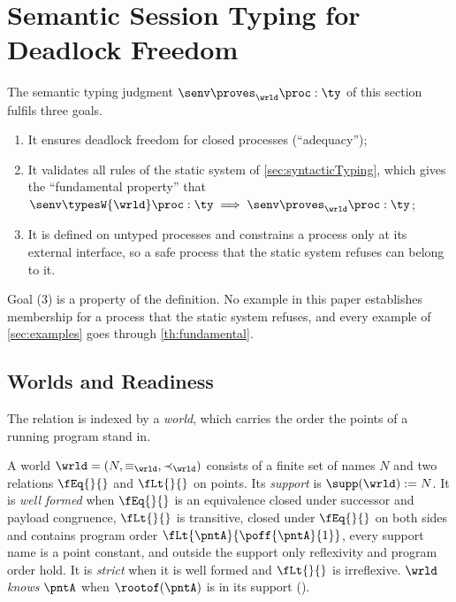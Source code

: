 \section{Semantic Session Typing for Deadlock Freedom}
\label{sec:logicalRelation}

The semantic typing judgment $\senv \proves_{\wrld} \proc : \ty$ of this
section fulfils three goals.
\begin{enumerate}[(1)]
  \item It ensures deadlock freedom for closed processes (``adequacy'');
  \item
    It validates all rules of the static system of
    \cref{sec:syntacticTyping}, which gives the ``fundamental property''
    that
    $
      \senv \typesW{\wrld} \proc : \ty
      \implies
      \senv \proves_{\wrld} \proc : \ty
    $;
  \item It is defined on untyped processes and constrains a process only
    at its external interface, so a safe process that the static system
    refuses can belong to it.
\end{enumerate}
Goal (3) is a property of the definition. No example in this paper
establishes membership for a process that the static system refuses, and
every example of \cref{sec:examples} goes through
\cref{th:fundamental}.


\subsection{Worlds and Readiness}
\label{sec:worlds}

The relation is indexed by a \emph{world}, which carries the order the
points of a running program stand in.

\begin{definition}
\label{def:world}
  A world $\wrld = (N,{\equiv}_{\wrld},{\prec}_{\wrld})$ consists of a
  finite set of names $N$ and two relations $\fEq{}{}$ and $\fLt{}{}$ on points.
  Its \emph{support} is $\supp(\wrld) := N$. It is
  \emph{well formed} when $\fEq{}{}$ is an equivalence closed under
  successor and payload congruence, $\fLt{}{}$ is transitive, closed under
  $\fEq{}{}$ on both sides and contains program order
  $\fLt{\pntA}{\poff{\pntA}{1}}$, every support name is a point
  constant, and outside the support only reflexivity and program order
  hold. It is \emph{strict} when it is well formed and $\fLt{}{}$ is
  irreflexive.
  $\wrld$ \emph{knows} $\pntA$ when $\rootof(\pntA)$ is in its support
  ().
\end{definition}

